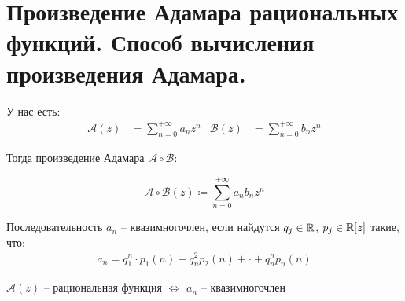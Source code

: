 \section{Произведение Адамара рациональных функций. Способ вычисления произведения Адамара.}

\begin{conj} 

    У нас есть: 
    \begin{align*}
        \mathscr A(z) &= \sum\limits_{n=0}^{+\infty} a_nz^n & \mathscr B(z) &= \sum\limits_{n=0}^{+\infty} b_nz^n
    \end{align*}
    
    Тогда произведение Адамара $\mathscr A \circ \mathscr B$: 

    \[
        \mathscr A \circ \mathscr B (z) \coloneqq \sum\limits_{n = 0}^{+\infty} a_n b_n z^n
    \]
\end{conj}
\begin{conj}
    Последовательность $a_n$ -- квазимногочлен, если найдутся $q_j \in \mathbb{R}$, $p_j \in \mathbb{R}[z]$ такие, что: 
    \begin{gather*}
        a_n = q_1^n \cdot p_1(n) + q_n^2 p_2(n) + \cdot + q_n^n p_n(n)
    \end{gather*} 
\end{conj}
\begin{lemma}
    $\mathcal{A}(z)$ -- рациональная функция $\Longleftrightarrow$ $a_n$ -- квазимногочлен
\end{lemma}
